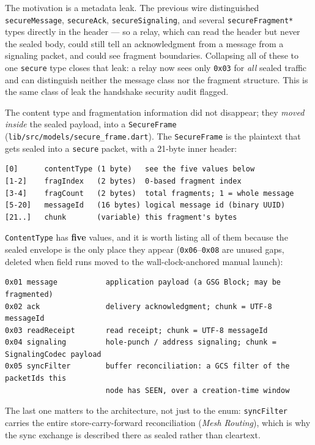 \documentclass[11pt]{report}
\newcommand{\code}[1]{\texttt{\small #1}}
\begin{document}
The motivation is a metadata leak. The previous wire distinguished \code{secureMessage}, \code{secureAck}, \code{secureSignaling}, and several \code{secureFragment*} types directly in the header — so a relay, which can read the header but never the sealed body, could still tell an acknowledgment from a message from a signaling packet, and could see fragment boundaries. Collapsing all of these to one \code{secure} type closes that leak: a relay now sees only \code{0x03} for \emph{all} sealed traffic and can distinguish neither the message class nor the fragment structure. This is the same class of leak the handshake security audit flagged.

The content type and fragmentation information did not disappear; they \emph{moved inside} the sealed payload, into a \code{SecureFrame} (\code{lib/src/models/secure_frame.dart}). The \code{SecureFrame} is the plaintext that gets sealed into a \code{secure} packet, with a 21-byte inner header:

\begin{verbatim}
[0]      contentType (1 byte)   see the five values below
[1-2]    fragIndex   (2 bytes)  0-based fragment index
[3-4]    fragCount   (2 bytes)  total fragments; 1 = whole message
[5-20]   messageId   (16 bytes) logical message id (binary UUID)
[21..]   chunk       (variable) this fragment's bytes
\end{verbatim}

\code{ContentType} has \textbf{five} values, and it is worth listing all of them because the sealed envelope is the only place they appear (\code{0x06}--\code{0x08} are unused gaps, deleted when field runs moved to the wall-clock-anchored manual launch):

\begin{verbatim}
0x01 message           application payload (a GSG Block; may be fragmented)
0x02 ack               delivery acknowledgment; chunk = UTF-8 messageId
0x03 readReceipt       read receipt; chunk = UTF-8 messageId
0x04 signaling         hole-punch / address signaling; chunk = SignalingCodec payload
0x05 syncFilter        buffer reconciliation: a GCS filter of the packetIds this
                       node has SEEN, over a creation-time window
\end{verbatim}

The last one matters to the architecture, not just to the enum: \code{syncFilter} carries the entire store-carry-forward reconciliation (\emph{Mesh Routing}), which is why the sync exchange is described there as sealed rather than cleartext.
\end{document}
